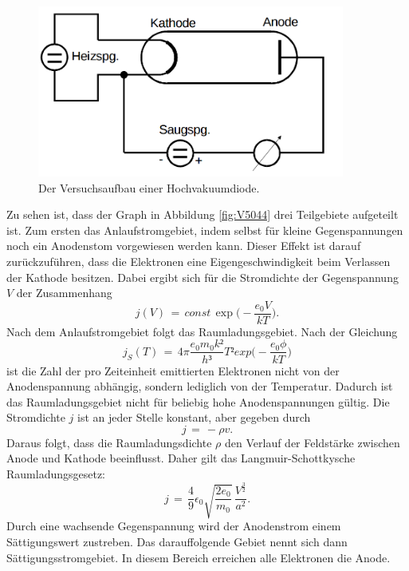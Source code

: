 \documentclass[
  bibliography=totoc,     %
  captions=tableheading,  %
  titlepage=firstiscover, %
]{scrartcl}
\begin{document}
\begin{figure}[H]
  \centering
  \includegraphics[width=0.9\textwidth]{V5045.png}
  \caption{Der Versuchsaufbau einer Hochvakuumdiode. \cite{anleitung}}
  \label{fig:V5045}
\end{figure}
\noindent
Zu sehen ist, dass der Graph in Abbildung \ref{fig:V5044} drei Teilgebiete aufgeteilt ist. Zum ersten das Anlaufstromgebiet, indem selbst für kleine Gegenspannungen noch ein Anodenstom vorgewiesen werden kann. Dieser Effekt ist darauf zurückzuführen, dass die Elektronen eine Eigengeschwindigkeit beim Verlassen der Kathode besitzen. Dabei ergibt sich für die Stromdichte der Gegenspannung $V$ der Zusammenhang
\begin{equation}
  j(V)\,=\,const\,\exp\Big(-\frac{e_0V}{kT}\Big).
  \label{eqn:stromdichte}
\end{equation}
Nach dem Anlaufstromgebiet folgt das Raumladungsgebiet. Nach der Gleichung
\begin{equation}
  j_S (T)\,=\,4\pi \frac{e_0 m_0 k²}{h³} T² exp\Big(-\frac{e_0 \phi}{kT}\Big)
  \label{eqn:richardson}
\end{equation}
ist die Zahl der pro Zeiteinheit emittierten Elektronen nicht von der Anodenspannung abhängig, sondern lediglich von der Temperatur. Dadurch ist das Raumladungsgebiet nicht für beliebig hohe Anodenspannungen gültig. Die Stromdichte $j$ ist an jeder Stelle konstant, aber gegeben durch
\begin{equation}
  j\,=\,-\rho v.
  \label{eqn:j}
\end{equation}
Daraus folgt, dass die Raumladungsdichte $\rho$ den Verlauf der Feldstärke zwischen Anode und Kathode beeinflusst. Daher gilt das Langmuir-Schottkysche Raumladungsgesetz:
\begin{equation}
  j\,=\,\frac{4}{9} \epsilon_0 \sqrt{\frac{2e_0}{m_0}}\,\frac{V^{\frac{3}{2}}}{a^2}.
  \label{eqn:raumladung}
\end{equation}
\noindent
Durch eine wachsende Gegenspannung wird der Anodenstrom einem Sättigungswert zustreben. Das darauffolgende Gebiet nennt sich dann Sättigungsstromgebiet. In diesem Bereich erreichen alle Elektronen die Anode.
\end{document}
